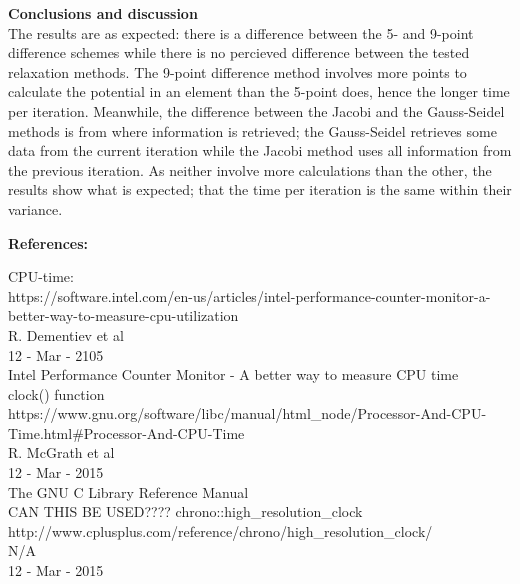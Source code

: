\documentclass[a4paper]{jpconf}
\begin{document}
\noindent \textbf{Conclusions and discussion} \\
The results are as expected: there is a difference between the 5- and 9-point difference schemes while there is no percieved difference between the tested relaxation methods. The 9-point difference method involves more points to calculate the potential in an element than the 5-point does, hence the longer time per iteration. Meanwhile, the difference between the Jacobi and the Gauss-Seidel methods is from where information is retrieved; the Gauss-Seidel retrieves some data from the current iteration while the Jacobi method uses all information from the previous iteration. As neither involve more calculations than the other, the results show what is expected; that the time per iteration is the same within their variance.



\textbf{References:}

CPU-time:\\
https://software.intel.com/en-us/articles/intel-performance-counter-monitor-a-better-way-to-measure-cpu-utilization \\
R. Dementiev et al \\
12 - Mar - 2105 \\
Intel Performance Counter Monitor - A better way to measure CPU time \\


clock() function \\
https://www.gnu.org/software/libc/manual/html_node/Processor-And-CPU-Time.html#Processor-And-CPU-Time \\
R. McGrath et al \\
12 - Mar - 2015 \\
The GNU C Library Reference Manual \\

CAN THIS BE USED????
chrono::high_resolution_clock \\
http://www.cplusplus.com/reference/chrono/high_resolution_clock/ \\
N/A \\
12 - Mar - 2015 \\
 ~\\
\end{document}
